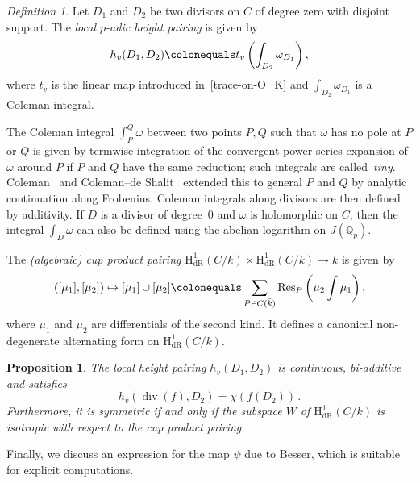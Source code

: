 \documentclass[11pt, a4paper]{amsart}
\newcommand{\Q}{\mathbb{Q}}
\newcommand{\hdr}{\operatorname{H^1_{dR}}}
\newcommand{\dv}{\operatorname{div}}
\newcommand{\Res}{\operatorname{Res}}
\newtheorem{proposition}[theorem]{Proposition}
\theoremstyle{remark}
\newtheorem{definition}[theorem]{Definition}
\numberwithin{equation}{section}
\newcommand{\sm}{{}}
\begin{document}
\begin{definition}\label{def:local-height-above-p}
Let $D_1$ and $D_2$ be two divisors on $C$ of degree zero with disjoint support. The {\it local $p$-adic height pairing} is given by
$$h_v(D_1,D_2)\colonequals t_v\left(\int_{D_2}\omega_{D_1}\right),$$ 
  where $t_v$ is the linear map introduced in~\eqref{trace-on-O_K} and $\int_{D_2}\omega_{D_1}$ is a Coleman integral. 
\end{definition} 
\sm{The Coleman integral $\int^Q_P\omega$ between two points $P,Q$ such that $\omega$ has no pole at $P$ or $Q$ is given by termwise integration of the convergent power series expansion of $\omega$ around $P$ if $P$ and $Q$ have the same reduction; such integrals are called~\textit{tiny}. 
Coleman~\cite{ColemanI} and Coleman--de Shalit~\cite{Coleman-deShalit} extended this to general $P$ and $Q$ by analytic continuation along Frobenius. Coleman integrals along divisors are then defined by additivity. If $D$ is a divisor of degree~0 and $\omega$ is holomorphic on $C$, then the integral $\int_D\omega$ can also be defined using the abelian logarithm on $J(\Q_p)$.}

The {\it (algebraic) cup product pairing} $\hdr(C/k)\times \hdr(C/k)\longrightarrow k$ is given by 
\begin{equation}\label{eq:cup-prod}
  ([\mu_1],[\mu_2])\mapsto [\mu_1]\cup[\mu_2]\colonequals \sum_{P\in
  C(\bar{k})} \Res_P\left(\mu_2\int\mu_1\right),
\end{equation}
where $\mu_1$ and $\mu_2$ are differentials of the second kind. It
defines a canonical non-degenerate alternating form on $\hdr(C/k)$.

\begin{proposition}{\cite[Proposition 5.2]{Coleman-Gross-Heights}}\label{prop:height-properties}
The local height pairing $h_v(D_1, D_2)$ is continuous, bi-additive and satisfies 
$$ h_v(\dv(f),D_2)=\chi(f(D_2))\,.$$
Furthermore, it is symmetric if and only if the subspace $W$ of $\hdr(C/k)$ is isotropic with respect to the cup product pairing.
\end{proposition} 

Finally, we discuss an expression for the map $\psi$ due to Besser, which
is suitable for explicit computations.
\end{document}

